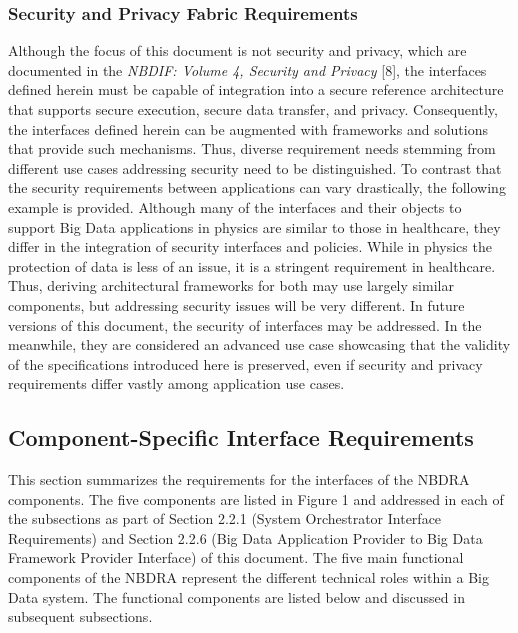 \documentclass[9pt,]{article}
\begin{document}
\hypertarget{security-and-privacy-fabric-requirements}{%
\subsubsection{Security and Privacy Fabric
Requirements}\label{security-and-privacy-fabric-requirements}}

Although the focus of this document is not security and privacy, which
are documented in the \emph{NBDIF: Volume 4, Security and Privacy}
{[}8{]}, the interfaces defined herein must be capable of integration
into a secure reference architecture that supports secure execution,
secure data transfer, and privacy. Consequently, the interfaces defined
herein can be augmented with frameworks and solutions that provide such
mechanisms. Thus, diverse requirement needs stemming from different use
cases addressing security need to be distinguished. To contrast that the
security requirements between applications can vary drastically, the
following example is provided. Although many of the interfaces and their
objects to support Big Data applications in physics are similar to those
in healthcare, they differ in the integration of security interfaces and
policies. While in physics the protection of data is less of an issue,
it is a stringent requirement in healthcare. Thus, deriving
architectural frameworks for both may use largely similar components,
but addressing security issues will be very different. In future
versions of this document, the security of interfaces may be addressed.
In the meanwhile, they are considered an advanced use case showcasing
that the validity of the specifications introduced here is preserved,
even if security and privacy requirements differ vastly among
application use cases.

\hypertarget{component-specific-interface-requirements}{%
\subsection{Component-Specific Interface
Requirements}\label{component-specific-interface-requirements}}

This section summarizes the requirements for the interfaces of the NBDRA
components. The five components are listed in Figure 1 and addressed in
each of the subsections as part of Section 2.2.1 (System Orchestrator
Interface Requirements) and Section 2.2.6 (Big Data Application Provider
to Big Data Framework Provider Interface) of this document. The five
main functional components of the NBDRA represent the different
technical roles within a Big Data system. The functional components are
listed below and discussed in subsequent subsections.
\end{document}
